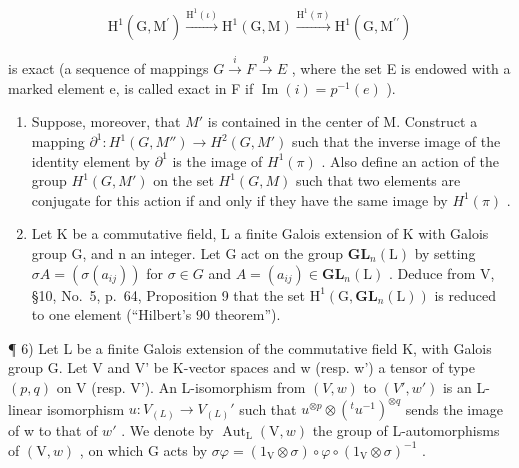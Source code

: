 \[
\mathrm{H} ^ {1} (\mathrm{G}, \mathrm{M} ^ {\prime}) \xrightarrow {\mathrm{H} ^ {1} (\iota)} \mathrm{H} ^ {1} (\mathrm{G}, \mathrm{M}) \xrightarrow {\mathrm{H} ^ {1} (\pi)} \mathrm{H} ^ {1} (\mathrm{G}, \mathrm{M} ^ {\prime \prime})
\]

is exact (a sequence of mappings \(G \xrightarrow{i} F \xrightarrow{p} E\) , where the set E is endowed with a marked element e, is called exact in F if \(\operatorname{Im}(i) = p^{-1}(e)\) ).

\begin{enumerate}
\def\labelenumi{\alph{enumi})}
\setcounter{enumi}{2}
\item
  Suppose, moreover, that \(M'\) is contained in the center of M. Construct a mapping \(\partial^{1}: H^{1}(G, M'') \to H^{2}(G, M')\) such that the inverse image of the identity element by \(\partial^{1}\) is the image of \(H^{1}(\pi)\) . Also define an action of the group \(H^{1}(G, M')\) on the set \(H^{1}(G, M)\) such that two elements are conjugate for this action if and only if they have the same image by \(H^{1}(\pi)\) .
\item
  Let K be a commutative field, L a finite Galois extension of K with Galois group G, and n an integer. Let G act on the group \(\mathbf{GL}_{n}(\mathrm{L})\) by setting \(\sigma A = (\sigma(a_{ij}))\) for \(\sigma \in G\) and \(A = (a_{ij}) \in \mathbf{GL}_{n}(\mathrm{L})\) . Deduce from V, §10, No.~5, p.~64, Proposition 9 that the set \(\mathrm{H}^{1}(\mathrm{G}, \mathbf{GL}_{n}(\mathrm{L}))\) is reduced to one element (``Hilbert's 90 theorem'').
\end{enumerate}

¶ 6) Let L be a finite Galois extension of the commutative field K, with Galois group G. Let V and V' be K-vector spaces and w (resp. w') a tensor of type \((p,q)\) on V (resp. V'). An L-isomorphism from \((V,w)\) to \((V',w')\) is an L-linear isomorphism \(u:V_{(L)}\to V_{(L)}'\) such that \(u^{\otimes p}\otimes(^{t}u^{-1})^{\otimes q}\) sends the image of w to that of \(w'\) . We denote by \(\operatorname{Aut}_{\mathrm{L}}(\mathrm{V},w)\) the group of L-automorphisms of \((\mathrm{V},w)\) , on which G acts by \(\sigma\varphi=(1_{\mathrm{V}}\otimes\sigma)\circ\varphi\circ(1_{\mathrm{V}}\otimes\sigma)^{-1}\) .

